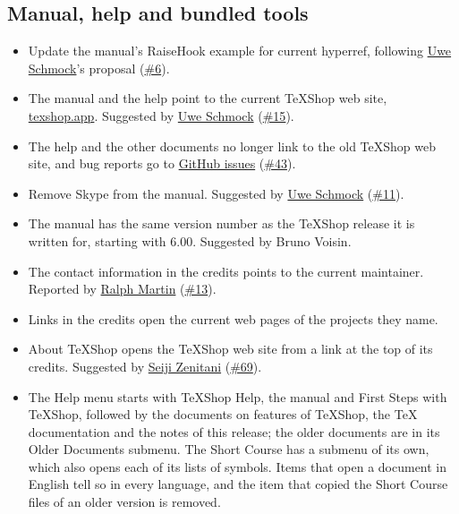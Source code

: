 \documentclass[11pt,letterpaper]{article}
\begin{document}
\subsection{Manual, help and bundled tools}

\begin{itemize}
\item Update the manual’s RaiseHook example for current hyperref, following \href{https://github.com/Uwe-Schmock}{Uwe Schmock}’s proposal (\href{https://github.com/TeXShopProject/TeXShop/issues/6}{\#6}).
\item The manual and the help point to the current TeXShop web site, \href{https://texshop.app/}{texshop.app}. Suggested by \href{https://github.com/Uwe-Schmock}{Uwe Schmock} (\href{https://github.com/TeXShopProject/TeXShop/issues/15}{\#15}).
\item The help and the other documents no longer link to the old TeXShop web site, and bug reports go to \href{https://github.com/TeXShopProject/TeXShop/issues}{GitHub issues} (\href{https://github.com/TeXShopProject/TeXShop/issues/43}{\#43}).
\item Remove Skype from the manual. Suggested by \href{https://github.com/Uwe-Schmock}{Uwe Schmock} (\href{https://github.com/TeXShopProject/TeXShop/issues/11}{\#11}).
\item The manual has the same version number as the TeXShop release it is written for, starting with 6.00. Suggested by Bruno Voisin.
\item The contact information in the credits points to the current maintainer. Reported by \href{https://github.com/ralphrmartin}{Ralph Martin} (\href{https://github.com/TeXShopProject/TeXShop/issues/13}{\#13}).
\item Links in the credits open the current web pages of the projects they name.
\item About TeXShop opens the TeXShop web site from a link at the top of its credits. Suggested by \href{https://github.com/zenitani}{Seiji Zenitani} (\href{https://github.com/TeXShopProject/TeXShop/issues/69}{\#69}).
\item The Help menu starts with TeXShop Help, the manual and First Steps with TeXShop, followed by the documents on features of TeXShop, the TeX documentation and the notes of this release; the older documents are in its Older Documents submenu. The Short Course has a submenu of its own, which also opens each of its lists of symbols. Items that open a document in English tell so in every language, and the item that copied the Short Course files of an older version is removed.

\end{itemize}
\end{document}
